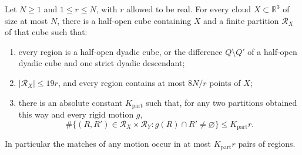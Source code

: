 \begin{lemma}
\label{lem:mot-partition}
Let $N\ge1$ and $1\le r\le N$, with $r$ allowed to be real.  For every cloud $X\subset\mathbb{R}^3$ of size at most $N$, there is a half-open cube containing $X$ and a finite partition $\mathcal{R}_X$ of that cube such that:
\begin{enumerate}
\item every region is a half-open dyadic cube, or the difference
$Q\setminus Q'$ of a half-open dyadic cube and one strict dyadic descendant;
\item $|\mathcal{R}_X|\le19r$, and every region contains at most
$8N/r$ points of $X$;
\item there is an absolute constant $K_{\mathrm{part}}$ such
that, for any two partitions obtained this way and every rigid motion $g$,
\[
 \#\{(R,R')\in\mathcal{R}_X\times\mathcal{R}_Y:
                         g(R)\cap R'\ne\varnothing\}
 \le K_{\mathrm{part}}r.
\]
\end{enumerate}
In particular the matches of any motion occur in at most $K_{\mathrm{part}}r$ pairs of regions.
\end{lemma}

